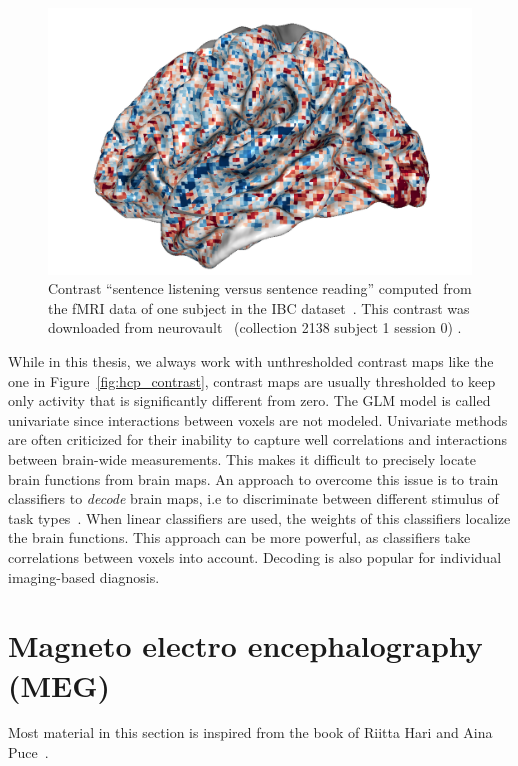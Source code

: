 \begin{figure}
  \includegraphics[scale=0.3]{figures/neuroscience/spatial_map.png}
  \caption{Contrast ``sentence listening versus sentence reading'' computed from the fMRI data of one
    subject in the IBC dataset~\cite{ibc, ibc2}. This contrast was downloaded
    from neurovault~\cite{gorgolewski2015neurovault} (collection 2138 subject 1 session 0) .}
  \label{fig:ibc_contrast}
\end{figure}


While in this thesis, we always work with unthresholded contrast maps like the one in Figure~\ref{fig:hcp_contrast}, contrast maps
are usually thresholded to keep only activity that is significantly
different from zero.
The GLM model is called univariate since interactions between voxels are not
modeled.
Univariate methods are often criticized for their inability to
capture well correlations and interactions between brain-wide measurements.
This makes it difficult to precisely locate brain functions from brain maps. An approach to overcome this issue is to train classifiers to \emph{decode} brain maps, i.e to discriminate between different stimulus of task
types~\cite{shirer_decoding_2012,varoquaux_how_2014,loula_decoding_2018}. When linear classifiers are used, the weights of this classifiers localize the brain functions.
This approach can be more powerful, as classifiers take correlations between
voxels into account. Decoding is also popular for individual imaging-based diagnosis.

\section{Magneto electro encephalography (MEG)}
Most material in this section is inspired from the book of Riitta Hari and Aina
Puce~\cite{hari2017meg}.

